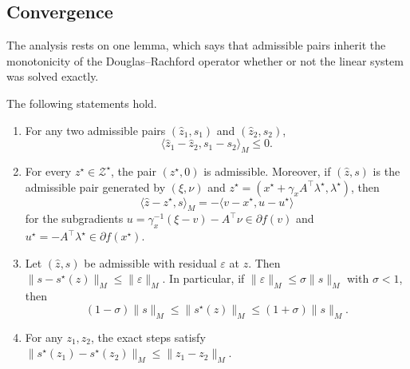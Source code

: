 \documentclass[11pt]{article}
\begin{document}
\subsection{Convergence}
The analysis rests on one lemma, which says that admissible pairs inherit the monotonicity of the Douglas--Rachford operator whether or not the linear system was solved exactly.
\begin{lemma}\label{lem:monotonicity}
    The following statements hold.
    \begin{enumerate}
        \item For any two admissible pairs $(\hat z_1, s_1)$ and $(\hat z_2, s_2)$,
        \begin{equation}\label{eq:acc-two-point}
            \langle \hat z_1 - \hat z_2, s_1 - s_2\rangle_M \leq 0.
        \end{equation}
        \item For every $z^\star \in \mathcal{Z}^\star$, the pair $(z^\star, 0)$ is admissible.
        Moreover, if $(\hat z, s)$ is the admissible pair generated by $(\xi, \nu)$ and $z^\star = (x^\star + \gamma_x A^\top\lambda^\star, \lambda^\star)$, then
        \begin{equation}\label{eq:montonicity-of-update}
            \langle \hat z - z^\star, s\rangle_M = -\langle v - x^\star, u - u^\star\rangle
        \end{equation}
        for the subgradients $u = \gamma_x^{-1}(\xi - v) - A^\top\nu \in \partial f(v)$ and $u^\star = -A^\top\lambda^\star \in \partial f(x^\star)$.
        \item Let $(\hat z, s)$ be admissible with residual $\varepsilon$ at $z$.
        Then $\|s - s^\star(z)\|_M \leq \|\varepsilon\|_M$.
        In particular, if $\|\varepsilon\|_M \leq \sigma\|s\|_M$ with $\sigma < 1$, then
        \begin{equation}\label{eq:acc-exact-vs-inexact}
            (1-\sigma)\|s\|_M \leq \|s^\star(z)\|_M \leq (1+\sigma)\|s\|_M.
        \end{equation}
        \item For any $z_1, z_2$, the exact steps satisfy $\|s^\star(z_1) - s^\star(z_2)\|_M \leq \|z_1 - z_2\|_M$.
    \end{enumerate}
\end{lemma}
\end{document}
